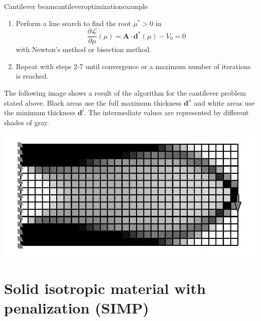 \begin{example}{Cantilever beam}{cantileveroptimizationexample}
\begin{enumerate}
\begin{align}
{{                (L^k_j-d^k_j)^2}{\mu A_j}} \\
                \mathbf{d}^* (\mu) &= \max\left(\tilde{\mathbf{d}}^{l,k}, \min \left(\hat{\mathbf{d}}(\mu), \mathbf{d}_u \right)\right)
            \end{align}
        \item Perform a line search to find the root $\mu^*>0$ in 
        \begin{equation}
            \frac{\partial \underline{\mathcal{L}}}{\partial \mu}(\mu) = \mathbf{A} \cdot \mathbf{d}^* (\mu) - V_0  = 0
        \end{equation}
        with Newton's method or bisection method. 
        \item Repeat with steps 2-7 until convergence or a maximum number of iterations is reached.
    \end{enumerate}

    The following image shows a result of the algorithm for the cantilever problem stated above. Black areas use the full maximum thickness $\mathbf{d}^u$ and white areas use the minimum thickness $\mathbf{d}^l$. The intermediate values are represented by different shades of gray.

    \begin{center}
        \includegraphics[width=\linewidth]{figures/cantilever_fem_optimized.pdf}
    \end{center}
    
\end{example}

\section{Solid isotropic material with penalization (SIMP)}

